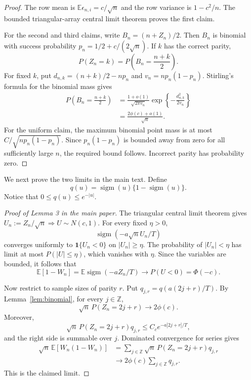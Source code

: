 \documentclass[twoside]{article}
\newcommand{\E}{\mathbb E}
\newcommand{\sigm}{\operatorname{sigm}}
\begin{document}
\begin{proof}
The row mean is $\E\epsilon_{n,i}=c/\sqrt n$ and the row variance is $1-c^2/n$. The bounded triangular-array central limit theorem proves the first claim.

For the second and third claims, write $B_n=(n+Z_n)/2$. Then $B_n$ is binomial with success probability $p_n=1/2+c/(2\sqrt n)$. If $k$ has the correct parity,
\[
P(Z_n=k)=P\left(B_n=\frac{n+k}{2}\right).
\]
For fixed $k$, put $d_{n,k}=(n+k)/2-np_n$ and $v_n=np_n(1-p_n)$. Stirling's formula for the binomial mass gives
\begin{align*}
P\left(B_n=\frac{n+k}{2}\right)
&=\frac{1+o(1)}{\sqrt{2\pi v_n}}
\exp\left\{-\frac{d_{n,k}^2}{2v_n}\right\}\\
&=\frac{2\phi(c)+o(1)}{\sqrt n}.
\end{align*}
For the uniform claim, the maximum binomial point mass is at most $C/\sqrt{np_n(1-p_n)}$. Since $p_n(1-p_n)$ is bounded away from zero for all sufficiently large $n$, the required bound follows. Incorrect parity has probability zero.
\end{proof}

We next prove the two limits in the main text. Define
\[
q(u)=\sigm(u)\{1-\sigm(u)\}.
\]
Notice that $0\leq q(u)\leq e^{-|u|}$.

\begin{proof}[Proof of Lemma 3 in the main paper]
The triangular central limit theorem gives $U_n:=Z_n/\sqrt n\Rightarrow U\sim N(c,1)$. For every fixed $\eta>0$,
\[
\sigm(-a\sqrt n U_n/T)
\]
converges uniformly to $\mathbf 1\{U_n<0\}$ on $|U_n|\geq\eta$. The probability of $|U_n|<\eta$ has limit at most $P(|U|\leq\eta)$, which vanishes with $\eta$. Since the variables are bounded, it follows that
\[
\E[1-W_n]=\E\sigm(-aZ_n/T)\longrightarrow P(U<0)=\Phi(-c).
\]

Now restrict to sample sizes of parity $r$. Put $q_{j,r}=q(a(2j+r)/T)$. By Lemma~\ref{lem:binomial}, for every $j\in\mathbb Z$,
\[
\sqrt n\,P(Z_n=2j+r)\longrightarrow2\phi(c).
\]
Moreover,
\[
\sqrt n\,P(Z_n=2j+r)q_{j,r}
\leq C_c e^{-a|2j+r|/T},
\]
and the right side is summable over $j$. Dominated convergence for series gives
\begin{align*}
\sqrt n\,\E[W_n(1-W_n)]
&=\sum_{j\in\mathbb Z}\sqrt n\,P(Z_n=2j+r)
q_{j,r}\\
&\longrightarrow2\phi(c)
\sum_{j\in\mathbb Z}q_{j,r}.
\end{align*}
This is the claimed limit.
\end{proof}
\end{document}
